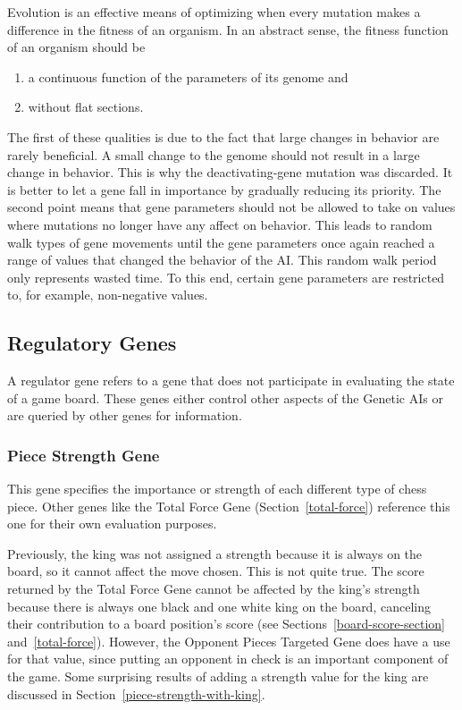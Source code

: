 \documentclass[letterpaper]{article}
\renewcommand{\_}{\allowbreak\textunderscore\allowbreak}
\begin{document}
Evolution is an effective means of optimizing when every mutation makes a difference in the fitness of an organism. In an abstract sense, the fitness function of an organism should be
\begin{enumerate}
	\item a continuous function of the parameters of its genome and
	\item without flat sections.
\end{enumerate}
The first of these qualities is due to the fact that large changes in behavior are rarely beneficial. A small change to the genome should not result in a large change in behavior. This is why the deactivating-gene mutation was discarded. It is better to let a gene fall in importance by gradually reducing its priority. The second point means that gene parameters should not be allowed to take on values where mutations no longer have any affect on behavior. This leads to random walk types of gene movements until the gene parameters once again reached a range of values that changed the behavior of the AI\@. This random walk period only represents wasted time. To this end, certain gene parameters are restricted to, for example, non-negative values.

\subsection{Regulatory Genes}
A regulator gene refers to a gene that does not participate in evaluating the state of a game board. These genes either control other aspects of the Genetic AIs or are queried by other genes for information.

\subsubsection{Piece Strength Gene}\label{piece-strength}

This gene specifies the importance or strength of each different type of chess piece. Other genes like the Total Force Gene (Section~\ref{total-force}) reference this one for their own evaluation purposes.

Previously, the king was not assigned a strength because it is always on the board, so it cannot affect the move chosen. This is not quite true. The score returned by the Total Force Gene cannot be affected by the king's strength because there is always one black and one white king on the board, canceling their contribution to a board position's score (see Sections~\ref{board-score-section} and~\ref{total-force}). However, the Opponent Pieces Targeted Gene does have a use for that value, since putting an opponent in check is an important component of the game. Some surprising results of adding a strength value for the king are discussed in Section~\ref{piece-strength-with-king}.
\end{document}
